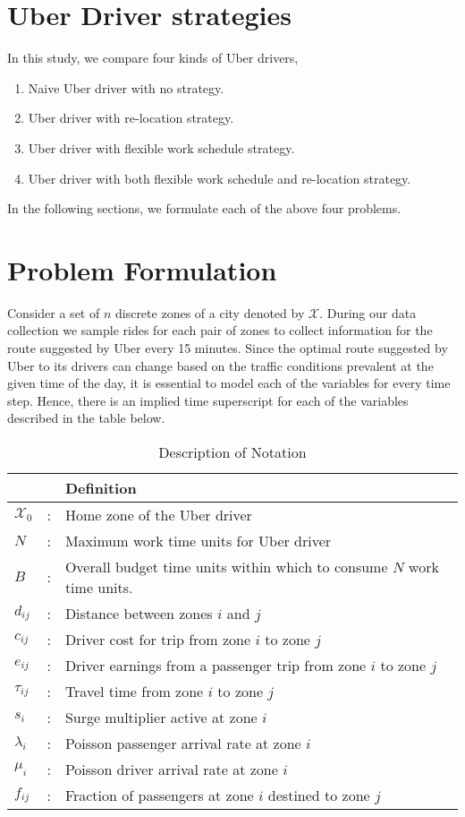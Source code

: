 \section{Uber Driver strategies}
In this study, we compare four kinds of Uber drivers, 
\begin{enumerate}
    \item Naive Uber driver with no strategy.
    \item Uber driver with re-location strategy.
    \item Uber driver with flexible work schedule strategy.
    \item Uber driver with both flexible work schedule and re-location strategy.
\end{enumerate}
In the following sections, we formulate each of the above four problems.

\section{Problem Formulation}
Consider a set of $n$ discrete zones of a city denoted by $\mathcal{X}$. During our data collection we sample rides for each pair of zones to collect information for the route suggested by Uber every 15 minutes. Since the optimal route suggested by Uber to its drivers can change based on the traffic conditions prevalent at the given time of the day, it is essential to model each of the variables for every time step. Hence, there is an implied time superscript for each of the variables described in the table below.
\begin {table}[h]
\caption {Description of Notation} 
\label{tab:notation1} 
\centering
\begin{tabular}{l c p{}}
\toprule
       &                  & Definition \\
\midrule
$\mathcal{X}_0$&:& Home zone of the Uber driver \\
$N$&:& Maximum work time units for Uber driver \\
$B$&:& Overall budget time units within which to consume $N$ work time units. \\
$d_{ij}$&:& Distance between zones $i$ and $j$  \\
$c_{ij}$&:& Driver cost for trip from zone $i$ to zone $j$ \\
$e_{ij}$&:& Driver earnings from a passenger trip from zone $i$ to zone $j$ \\
$\tau_{ij}$&:& Travel time from zone $i$ to zone $j$  \\
$s_{i}$&:& Surge multiplier active at zone $i$ \\
$\lambda_{i}$&:& Poisson passenger arrival rate at zone $i$ \\
$\mu_{i}$&:& Poisson driver arrival rate at zone $i$ \\
$f_{ij}$&:& Fraction of passengers at zone $i$ destined to zone $j$ \\
\bottomrule
\end{tabular}
\end {table}

